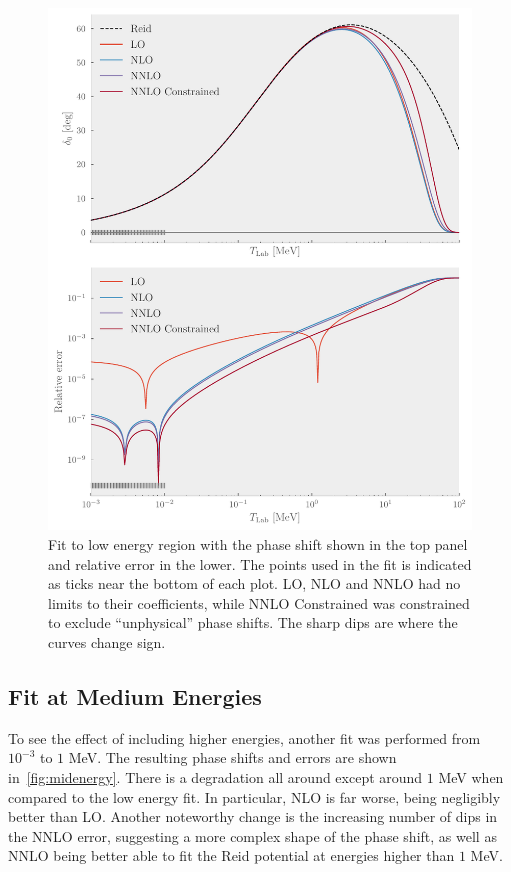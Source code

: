 \begin{figure}[pt]
  \centering
  \includegraphics{Figures/lowenergy.pdf}
  \caption{\label{fig:lowenergy} Fit to low energy region with the phase shift
    shown in the top panel and relative error in the lower. The points used in
    the fit is indicated as ticks near the bottom of each plot. LO, NLO and NNLO
  had no limits to their coefficients, while NNLO Constrained was constrained to
 exclude ``unphysical'' phase shifts. The sharp dips are where the curves change
sign.}
\end{figure}

\subsection{Fit at Medium Energies}

To see the effect of including higher energies, another fit was performed from \(10^{-3}\)
to \(1\) MeV. The resulting phase shifts and errors are shown
in~\cref{fig:midenergy}. There is a degradation all around except around \(1\) MeV
when compared to the low energy fit. In particular, NLO is far worse, being
negligibly better than LO. Another noteworthy change is the increasing number of
dips in the NNLO error, suggesting a more complex shape of the phase shift, as
well as NNLO being better able to fit the Reid potential at energies higher than \(1\) MeV.

